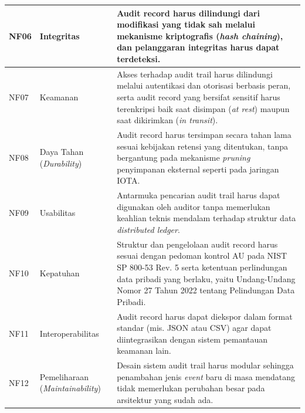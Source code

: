 \begin{xltabular}{\textwidth}{|>{\centering\arraybackslash}p{1.4cm}|>{\raggedright\arraybackslash}p{2.6cm}|X|}
    NF06 & Integritas & Audit record harus dilindungi dari modifikasi yang tidak sah melalui mekanisme kriptografis (\textit{hash chaining}), dan pelanggaran integritas harus dapat terdeteksi. \\
    \hline

    NF07 & Keamanan & Akses terhadap audit trail harus dilindungi melalui autentikasi dan otorisasi berbasis peran, serta audit record yang bersifat sensitif harus terenkripsi baik saat disimpan (\textit{at rest}) maupun saat dikirimkan (\textit{in transit}). \\
    \hline

    NF08 & Daya Tahan (\textit{Durability}) & Audit record harus tersimpan secara tahan lama sesuai kebijakan retensi yang ditentukan, tanpa bergantung pada mekanisme \textit{pruning} penyimpanan eksternal seperti pada jaringan IOTA. \\
    \hline

    NF09 & Usabilitas & Antarmuka pencarian audit trail harus dapat digunakan oleh auditor tanpa memerlukan keahlian teknis mendalam terhadap struktur data \textit{distributed ledger}. \\
    \hline

    NF10 & Kepatuhan & Struktur dan pengelolaan audit record harus sesuai dengan pedoman kontrol AU pada NIST SP 800-53 Rev. 5 serta ketentuan perlindungan data pribadi yang berlaku, yaitu Undang-Undang Nomor 27 Tahun 2022 tentang Pelindungan Data Pribadi. \\
    \hline

    NF11 & Interoperabilitas & Audit record harus dapat diekspor dalam format standar (mis. JSON atau CSV) agar dapat diintegrasikan dengan sistem pemantauan keamanan lain. \\
    \hline

    NF12 & Pemeliharaan (\textit{Maintainability}) & Desain sistem audit trail harus modular sehingga penambahan jenis \textit{event} baru di masa mendatang tidak memerlukan perubahan besar pada arsitektur yang sudah ada. \\
    \hline

\end{xltabular}